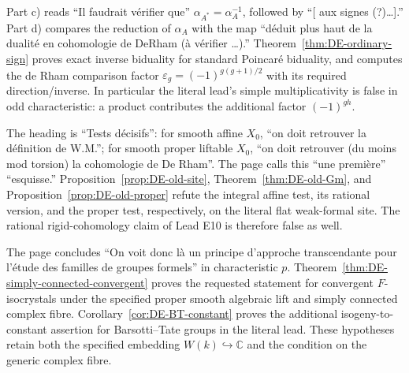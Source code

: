 \begin{remark}\label{rem:DE-quote-E9}
Part c) reads ``Il faudrait vérifier que'' $\alpha_{A^*}=\alpha_A^{-1}$, followed by ``[ aux signes (?)\ldots].''  Part d) compares the reduction of $\alpha_A$ with the map ``déduit plus haut de la dualité en cohomologie de DeRham (à vérifier \ldots).''  Theorem~\ref{thm:DE-ordinary-sign} proves exact inverse biduality for standard Poincaré biduality, and computes the de Rham comparison factor
$\varepsilon_g=(-1)^{g(g+1)/2}$ with its required direction/inverse.  In particular the literal lead's simple multiplicativity is false in odd characteristic: a product contributes the additional factor $(-1)^{gh}$.
\end{remark}

\begin{remark}\label{rem:DE-quote-E10}
The heading is ``Tests décisifs'': for smooth affine $X_0$, ``on doit retrouver la définition de W.M.''; for smooth proper liftable $X_0$, ``on doit retrouver (du moins mod torsion) la cohomologie de De Rham''.  The page calls this ``une première'' ``esquisse.''  Proposition~\ref{prop:DE-old-site}, Theorem~\ref{thm:DE-old-Gm}, and Proposition~\ref{prop:DE-old-proper} refute the integral affine test, its rational version, and the proper test, respectively, on the literal flat weak-formal site.  The rational rigid-cohomology claim of Lead E10 is therefore false as well.
\end{remark}

\begin{remark}\label{rem:DE-quote-E11}
The page concludes ``On voit donc là un principe d'approche transcendante pour l'étude des familles de groupes formels'' in characteristic $p$.  Theorem~\ref{thm:DE-simply-connected-convergent} proves the requested statement for convergent $F$-isocrystals under the specified proper smooth algebraic lift and simply connected complex fibre.  Corollary~\ref{cor:DE-BT-constant} proves the additional isogeny-to-constant assertion for Barsotti--Tate groups in the literal lead.  These hypotheses retain both the specified embedding $W(k)\hookrightarrow\mathbb C$ and the condition on the generic complex fibre.
\end{remark}
